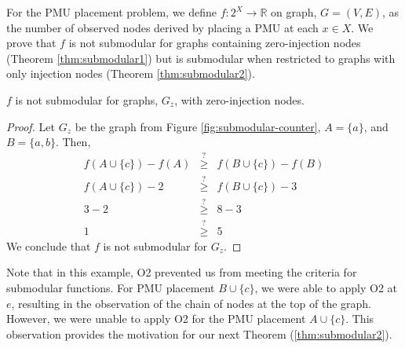 For the PMU placement problem, we define $f: 2^X \rightarrow \mathbb{R}$ on graph, $G=(V,E)$, as the number of observed nodes derived by placing a PMU at each $x \in X$.  
We prove that $f$ is not submodular for graphs containing zero-injection nodes (Theorem \ref{thm:submodular1}) but is submodular when restricted
to graphs with only injection nodes (Theorem \ref{thm:submodular2}). 


\begin{theorem}
\label{thm:submodular1}
$f$ is not submodular for graphs, $G_z$, with zero-injection nodes.
\end{theorem}

\begin{proof}
Let $G_z$ be the graph from Figure \ref{fig:submodular-counter}, $A=\{a\}$, and $B=\{a,b\}$. Then, %
\begin{eqnarray*}
f(A \cup \{c\}) - f(A) &\stackrel{?}{\geq}& f(B \cup \{c\}) - f(B) \\
f(A \cup \{c\}) - 2 &\stackrel{?}{\geq}& f(B \cup \{c\}) - 3 \\
3-2 &\stackrel{?}{\geq}& 8 - 3 \\
1 &\stackrel{?}{\geq}& 5
\end{eqnarray*}
We conclude that $f$ is not submodular for $G_z$. %
\end{proof}

Note that in this example, O2 prevented us from meeting the criteria for submodular functions.  For PMU placement $B \cup \{c\}$, we were able to apply O2 at $e$, resulting in the observation of the
chain of nodes at the top of the graph.  However, we were unable to apply O2 for the PMU placement $A \cup \{c\}$.  This observation provides the motivation for our next Theorem (\ref{thm:submodular2}).
  

